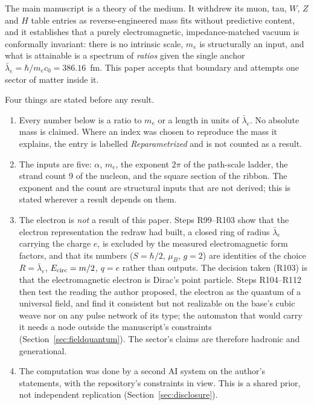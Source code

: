 \documentclass[11pt,a4paper]{article}
\theoremstyle{plain}
\theoremstyle{remark}
\newcommand{\lb}{\ensuremath{\bar\lambda_e}}
\begin{document}
The main manuscript \cite{dsmodel} is a theory of the medium. It withdrew its muon, tau, $W$,
$Z$ and $H$ table entries as reverse-engineered mass fits without predictive content, and it
establishes that a purely electromagnetic, impedance-matched vacuum is conformally invariant:
there is no intrinsic scale, $m_e$ is structurally an input, and what is attainable is a spectrum
of \emph{ratios} given the single anchor $\lb = \hbar/m_e c_0 = 386.16$~fm. This paper accepts
that boundary and attempts one sector of matter inside it.

Four things are stated before any result.

\begin{enumerate}[nosep]
\item Every number below is a ratio to $m_e$ or a length in units of $\lb$. No absolute mass is
claimed. Where an index was chosen to reproduce the mass it explains, the entry is labelled
\emph{Reparametrized} and is not counted as a result.
\item The inputs are five: $\alpha$, $m_e$, the exponent $2\pi$ of the path-scale ladder, the
strand count 9 of the nucleon, and the square section of the ribbon. The exponent and the count
are structural inputs that are not derived; this is stated wherever a result depends on them.
\item The electron is \emph{not} a result of this paper. Steps R99--R103 show that the electron
representation the redraw had built, a closed ring of radius $\lb$ carrying the charge $e$, is
excluded by the measured electromagnetic form factors, and that its numbers ($S = \hbar/2$,
$\mu_B$, $g = 2$) are identities of the choice $R = \lb$, $E_{\rm circ} = m/2$, $q = e$ rather than
outputs. The decision taken (R103) is that the electromagnetic electron is Dirac's point particle.
Steps R104--R112 then test the reading the author proposed, the electron as the quantum of a
universal field, and find it consistent but not realizable on the base's cubic weave nor on any
pulse network of its type; the automaton that would carry it needs a node outside the
manuscript's constraints (Section~\ref{sec:fieldquantum}). The sector's claims are therefore
hadronic and generational.
\item The computation was done by a second AI system on the author's statements, with the
repository's constraints in view. This is a shared prior, not independent replication
(Section~\ref{sec:disclosure}).
\end{enumerate}

\end{document}
